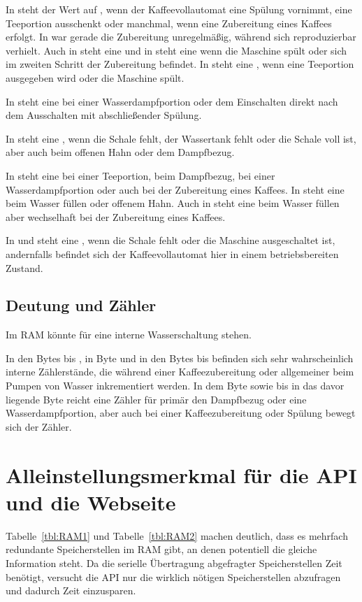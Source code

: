 In  steht der Wert auf , wenn der Kaffeevollautomat eine Spülung vornimmt, eine Teeportion ausschenkt oder manchmal, wenn eine Zubereitung eines Kaffees erfolgt.
In  war gerade die Zubereitung unregelmäßig, während sich  reproduzierbar verhielt.
Auch in  steht eine  und in  steht eine  wenn die Maschine spült oder sich im zweiten Schritt der Zubereitung befindet.
In  steht eine , wenn eine Teeportion ausgegeben wird oder die Maschine spült.

In  steht eine  bei einer Wasserdampfportion oder dem Einschalten direkt nach dem Ausschalten mit abschließender Spülung.

In  steht eine , wenn die Schale fehlt, der Wassertank fehlt oder die Schale voll ist, aber auch beim offenen Hahn oder dem Dampfbezug.

In  steht eine  bei einer Teeportion, beim Dampfbezug, bei einer Wasserdampfportion oder auch bei der Zubereitung eines Kaffees.
In  steht eine  beim Wasser füllen oder offenem Hahn.
Auch in  steht eine  beim Wasser füllen aber wechselhaft bei der Zubereitung eines Kaffees.

In  und  steht eine , wenn die Schale fehlt oder die Maschine ausgeschaltet ist, andernfalls befindet sich der Kaffeevollautomat hier in einem betriebsbereiten Zustand.

\subsection{Deutung und Zähler}
Im \ac{RAM} könnte  für eine interne Wasserschaltung stehen.

In den Bytes  bis , in Byte  und in den Bytes  bis  befinden sich sehr wahrscheinlich interne Zählerstände, die während einer Kaffeezubereitung oder allgemeiner beim Pumpen von Wasser inkrementiert werden.
In dem Byte  sowie bis in das davor liegende Byte  reicht eine Zähler für primär den Dampfbezug oder eine Wasserdampfportion, aber auch bei einer Kaffeezubereitung oder Spülung bewegt sich der Zähler.

\section{Alleinstellungsmerkmal für die API und die Webseite}
Tabelle~\ref{tbl:RAM1} und Tabelle~\ref{tbl:RAM2} machen deutlich, dass es mehrfach redundante Speicherstellen im \ac{RAM} gibt, an denen potentiell die gleiche Information steht.
Da die serielle Übertragung abgefragter Speicherstellen Zeit benötigt, versucht die \ac{API} nur die wirklich nötigen Speicherstellen abzufragen und dadurch Zeit einzusparen.


